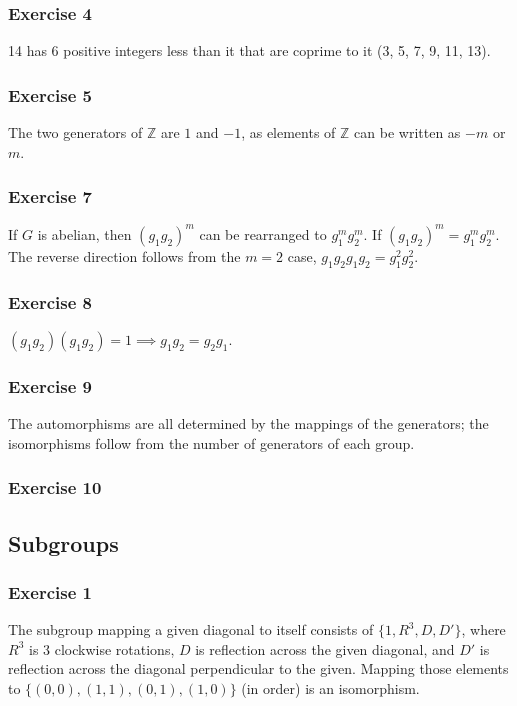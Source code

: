 \subsubsection{Exercise 4}
14 has 6 positive integers less than it that are coprime to it (3, 5, 7, 9, 11, 13).

\subsubsection{Exercise 5}
The two generators of $\mathbb{Z}$ are $1$ and $-1$, as elements of $\mathbb{Z}$ can be written as $-m$ or $m$.

\subsubsection{Exercise 7}
If $G$ is abelian, then $(g_1 g_2)^m$ can be rearranged to $g_1^m g_2^m$. If $(g_1 g_2)^m = g_1^m g_2^m$.
The reverse direction follows from the $m = 2$ case, $g_1 g_2 g_1 g_2 = g_1^2 g_2^2$.

\subsubsection{Exercise 8}
$(g_1 g_2) (g_1 g_2) = 1 \implies g_1 g_2 = g_2 g_1$.

\subsubsection{Exercise 9}
The automorphisms are all determined by the mappings of the generators; the isomorphisms follow from the
number of generators of each group.

\subsubsection{Exercise 10}

\subsection{Subgroups}

\subsubsection{Exercise 1}
The subgroup mapping a given diagonal to itself consists of $\{1, R^3, D, D'\}$, where
$R^3$ is 3 clockwise rotations, $D$ is reflection across the given diagonal, and $D'$ is
reflection across the diagonal perpendicular to the given. Mapping those elements to
$\{(0, 0), (1, 1), (0, 1), (1, 0)\}$ (in order) is an isomorphism.

